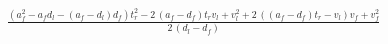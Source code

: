 $\frac{{\left(a_f^{2} - a_f d_l - {\left(a_f - d_l\right)} d_f\right)} t_r^{2} - 2 \, {\left(a_f - d_f\right)} t_r v_l + v_l^{2} + 2 \, {\left({\left(a_f - d_f\right)} t_r - v_l\right)} v_f + v_f^{2}}{2 \, {\left(d_l - d_f\right)}}$
